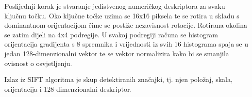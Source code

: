 Poslijednji korak je stvaranje jedistvenog numeričkog deskriptora za svaku ključnu točku. Oko ključne točke uzima se 16x16 piksela te se rotira u skladu s dominantnom orijentacijom čime se postiže nezavisnost rotacije. Rotirana okolina se zatim dijeli na 4x4 podregije. U svakoj podregiji računa se histogram orijentacija gradijenta s 8 spremnika i vrijednosti iz svih 16 histograma spaja se u jedan 128-dimenzionalni vektor te se vektor normalizira kako bi se smanjila ovisnost o osvjetljenju.

Izlaz iz SIFT algoritma je skup detektiranih značajki, tj. njen položaj, skala, orijentacija i 128-dimenzionalni deskriptor.